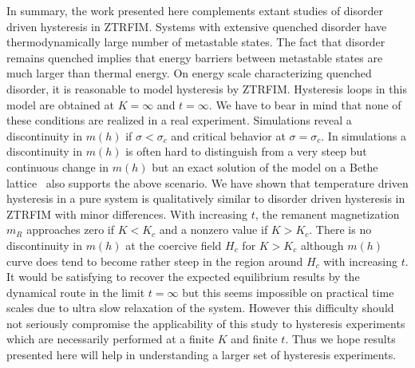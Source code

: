 \documentclass[a4,aps,amsmath,floatfix,nofootinbib,10pt]{revtex4}
\begin{document}
In summary, the work presented here complements extant studies of 
disorder driven hysteresis in ZTRFIM. Systems with extensive quenched 
disorder have thermodynamically large number of metastable states. The 
fact that disorder remains quenched implies that energy barriers 
between metastable states are much larger than thermal energy. On 
energy scale characterizing quenched disorder, it is reasonable to 
model hysteresis by ZTRFIM. Hysteresis loops in this model are obtained 
at $K=\infty$ and $t=\infty$. We have to bear in mind that none of 
these conditions are realized in a real experiment. Simulations reveal 
a discontinuity in $m(h)$ if $\sigma < \sigma_c$ and critical behavior 
at $\sigma =\sigma_c$. In simulations a discontinuity in $m(h)$ is 
often hard to distinguish from a very steep but continuous change in 
$m(h)$ but an exact solution of the model on a Bethe 
lattice~\cite{dhar} also supports the above scenario. We have shown 
that temperature driven hysteresis in a pure system is qualitatively 
similar to disorder driven hysteresis in ZTRFIM with minor differences. 
With increasing $t$, the remanent magnetization $m_R$ approaches zero 
if $K < K_c$ and a nonzero value if $K > K_c$. There is no 
discontinuity in $m(h)$ at the coercive field $H_c$ for $K>K_c$ 
although $m(h)$ curve does tend to become rather steep in the region 
around $H_c$ with increasing $t$. It would be satisfying to recover the 
expected equilibrium results by the dynamical route in the limit 
$t=\infty$ but this seems impossible on practical time scales due to 
ultra slow relaxation of the system. However this difficulty should not 
seriously compromise the applicability of this study to hysteresis 
experiments which are necessarily performed at a finite $K$ and finite 
$t$. Thus we hope results presented here will help in understanding a 
larger set of hysteresis experiments.
\end{document}
